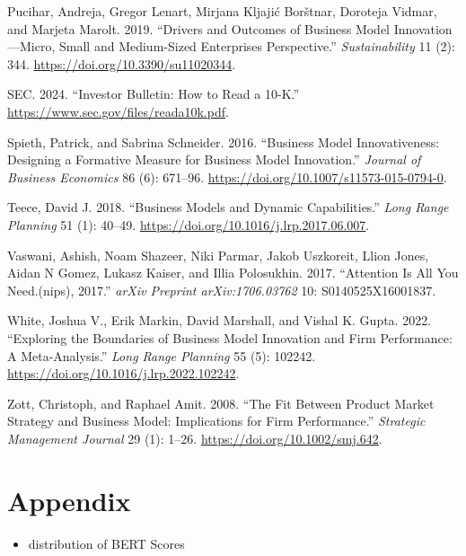 \documentclass[
]{article}
\providecommand{\tightlist}{%
  \setlength{\itemsep}{0pt}\setlength{\parskip}{0pt}}\usepackage{longtable,booktabs,array}
\newlength{\cslhangindent}
\newenvironment{CSLReferences}[2] %
 {\begin{list}{}{%
  \setlength{\itemindent}{0pt}
  \setlength{\leftmargin}{0pt}
  \setlength{\parsep}{0pt}
  \ifodd #1
   \setlength{\leftmargin}{\cslhangindent}
   \setlength{\itemindent}{-1\cslhangindent}
  \fi
  \setlength{\itemsep}{#2\baselineskip}}}
 {\end{list}}
\begin{document}
\begin{CSLReferences}{1}{0}
Pucihar, Andreja, Gregor Lenart, Mirjana Kljajić Borštnar, Doroteja
Vidmar, and Marjeta Marolt. 2019. {``Drivers and {Outcomes} of
{Business} {Model} {Innovation}---{Micro}, {Small} and {Medium}-{Sized}
{Enterprises} {Perspective}.''} \emph{Sustainability} 11 (2): 344.
\url{https://doi.org/10.3390/su11020344}.

SEC. 2024. {``Investor {Bulletin}: {How} to {Read} a 10-{K}.''}
\url{https://www.sec.gov/files/reada10k.pdf}.

Spieth, Patrick, and Sabrina Schneider. 2016. {``Business Model
Innovativeness: Designing a Formative Measure for Business Model
Innovation.''} \emph{Journal of Business Economics} 86 (6): 671--96.
\url{https://doi.org/10.1007/s11573-015-0794-0}.

Teece, David J. 2018. {``Business Models and Dynamic Capabilities.''}
\emph{Long Range Planning} 51 (1): 40--49.
\url{https://doi.org/10.1016/j.lrp.2017.06.007}.

Vaswani, Ashish, Noam Shazeer, Niki Parmar, Jakob Uszkoreit, Llion
Jones, Aidan N Gomez, Lukasz Kaiser, and Illia Polosukhin. 2017.
{``Attention Is All You Need.(nips), 2017.''} \emph{arXiv Preprint
arXiv:1706.03762} 10: S0140525X16001837.

White, Joshua V., Erik Markin, David Marshall, and Vishal K. Gupta.
2022. {``Exploring the Boundaries of Business Model Innovation and Firm
Performance: {A} Meta-Analysis.''} \emph{Long Range Planning} 55 (5):
102242. \url{https://doi.org/10.1016/j.lrp.2022.102242}.

Zott, Christoph, and Raphael Amit. 2008. {``The Fit Between Product
Market Strategy and Business Model: Implications for Firm
Performance.''} \emph{Strategic Management Journal} 29 (1): 1--26.
\url{https://doi.org/10.1002/smj.642}.

\end{CSLReferences}

\newpage{}

\section{Appendix}\label{appendix}

\begin{itemize}
\tightlist
\item
  distribution of BERT Scores
\end{itemize}
\end{document}
